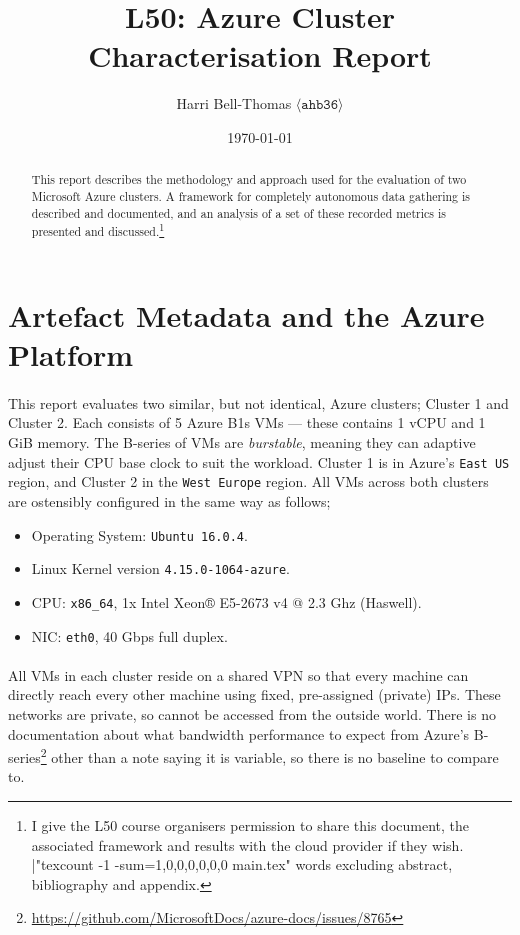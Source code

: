 \documentclass[a4paper,10pt]{article}
\begin{document}
\title{\textbf{L50: Azure Cluster Characterisation Report}}
\author{Harri Bell-Thomas $\langle \texttt{ahb36} \rangle$}
\date{\today}

\maketitle


\begin{abstract}
This report describes the methodology and approach used for the evaluation of two Microsoft Azure clusters. A framework for completely autonomous data gathering is described and documented, and an analysis of a set of these recorded metrics is presented and discussed.\footnote{I give the L50 course organisers permission to share this document, the associated framework and results with the cloud provider if they wish. |"texcount -1 -sum=1,0,0,0,0,0,0 main.tex" words excluding abstract, bibliography and appendix.}
\end{abstract}

\section{Artefact Metadata and the Azure Platform}
\paragraph{} This report evaluates two similar, but not identical, Azure clusters; Cluster 1 and Cluster 2. Each consists of 5 Azure B1s VMs --- these contains 1 vCPU and 1 GiB memory. The B-series of VMs are \textit{burstable}, meaning they can adaptive adjust their CPU base clock to suit the workload. Cluster 1 is in Azure's \texttt{East US} region, and Cluster 2 in the \texttt{West Europe} region. All VMs across both clusters are ostensibly configured in the same way as follows;
\begin{itemize}
    \item Operating System: \texttt{Ubuntu 16.0.4}.
    \item Linux Kernel version \texttt{4.15.0-1064-azure}.
    \item CPU: \texttt{x86\_64}, 1x Intel Xeon® E5-2673 v4 @ 2.3 Ghz (Haswell).
    \item NIC: \texttt{eth0}, 40 Gbps full duplex.
\end{itemize}

\paragraph{} All VMs in each cluster reside on a shared VPN so that every machine can directly reach every other machine using fixed, pre-assigned (private) IPs. These networks are private, so cannot be accessed from the outside world. There is no documentation about what bandwidth performance to expect from Azure's B-series\footnote{\url{https://github.com/MicrosoftDocs/azure-docs/issues/8765}} other than a note saying it is variable, so there is no baseline to compare to.
\end{document}
